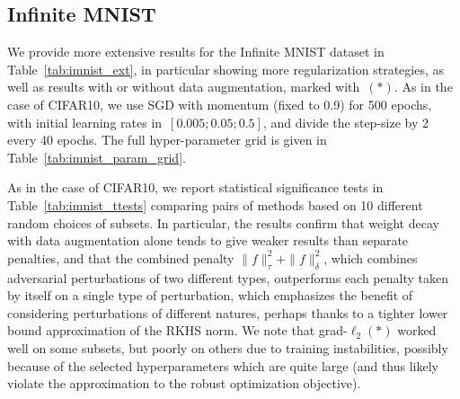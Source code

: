 \subsection{Infinite MNIST}
\label{sub:imnist_appx}

We provide more extensive results for the Infinite MNIST dataset in Table~\ref{tab:imnist_ext},
in particular showing more regularization strategies, as well as results with or without
data augmentation, marked with~$(\ast)$.
As in the case of CIFAR10, we use SGD with momentum (fixed to 0.9) for 500 epochs,
with initial learning rates in~$[0.005; 0.05; 0.5]$, and divide the step-size by 2 every 40 epochs.
The full hyper-parameter grid is given in Table~\ref{tab:imnist_param_grid}.


As in the case of CIFAR10, we report statistical significance tests in Table~\ref{tab:imnist_ttests} comparing pairs of
methods based on 10 different random choices of subsets.
In particular, the results confirm that weight decay with data augmentation alone
tends to give weaker results than separate penalties,
and that the combined penalty $\|f\|_\tau^2 + \|f\|_\delta^2$, which combines adversarial
perturbations of two different types,
outperforms each penalty taken by itself on a single type of perturbation,
which emphasizes the benefit of considering perturbations of different natures,
perhaps thanks to a tighter lower bound approximation of the RKHS norm.
We note that grad-$\ell_2 (\ast)$ worked well on some subsets,
but poorly on others due to training instabilities,
possibly because of the selected hyperparameters which are quite large
(and thus likely violate the approximation to the robust optimization objective).

